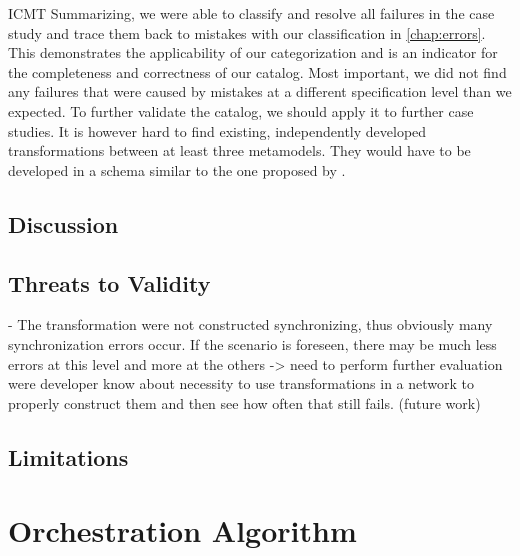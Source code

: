 \begin{copiedFrom}{ICMT}
Summarizing, we were able to classify and resolve all failures in the case study and trace them back to mistakes with our classification in \autoref{chap:errors}.
This demonstrates the applicability of our categorization and is an indicator for the completeness and correctness of our catalog.
Most important, we did not find any failures that were caused by mistakes at a different specification level than we expected.
To further validate the catalog, we should apply it to further case studies.
It is however hard to find existing, independently developed transformations between at least three metamodels.
They would have to be developed in a schema similar to the one proposed by \textcite{kramer2016c}.




\end{copiedFrom} %


\subsection{Discussion}


\subsection{Threats to Validity}
- The transformation were not constructed synchronizing, thus obviously many synchronization errors occur. If the scenario is foreseen, there may be much less errors at this level and more at the others -> need to perform further evaluation were developer know about necessity to use transformations in a network to properly construct them and then see how often that still fails. (future work)


\subsection{Limitations}




\section{Orchestration Algorithm}

